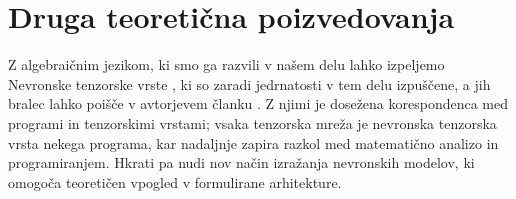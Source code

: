 \documentclass[a4paper, 12pt]{book}
\begin{document}
\section{Druga teoretična poizvedovanja}

Z algebraičnim jezikom, ki smo ga razvili v našem delu lahko izpeljemo Nevronske tenzorske vrste \cite{opCalProg}, ki so zaradi jedrnatosti v tem delu izpuščene, a jih bralec lahko poišče v avtorjevem članku \cite{opCalProg}. Z njimi je dosežena korespondenca med programi in tenzorskimi vrstami; vsaka tenzorska mreža je nevronska tenzorska vrsta nekega programa, kar nadaljnje zapira razkol med matematično analizo in programiranjem. Hkrati pa nudi nov način izražanja nevronskih modelov, ki omogoča teoretičen vpogled v formulirane arhitekture.

\newpage %
\ \\
\clearpage
{}


\end{document}
